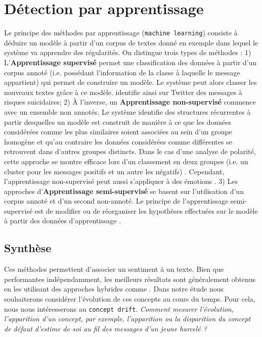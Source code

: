 \documentclass[utf8]{stageM2R} %
\theoremstyle{remark}
\renewcommand{\emph}{\textbf}
\begin{document}
\section{Détection par apprentissage}
Le principe des méthodes par apprentissage (\texttt{machine learning}) consiste à déduire un modèle à partir d'un corpus de textes donné en exemple dans lequel le système  va apprendre des régularités. On distingue  trois types de méthodes : 1) L'\emph{Apprentissage supervisé}
 permet une classification des données à partir d'un corpus annoté (i.e. possédant l'information de la classe à laquelle le message appartient) qui permet de construire un modèle. Le système peut alors classer les nouveaux textes grâce à ce modèle. \cite{Abboute2014} identifie ainsi sur Twitter des messages à risques suicidaires; 2)  À l'inverse, un \emph{Apprentissage non-supervisé}  commence  avec un ensemble non annotés. Le système  identifie des structures récurrentes à partir desquelles un modèle est construit de manière à ce que les données considérées comme les plus similaires soient associées au sein d'un groupe homogène et qu'au contraire les données considérées comme différentes se retrouvent dans d'autres groupes distincts. Dans le cas d'une analyse de polarité, cette approche se montre efficace lors d'un classement en deux groupes  (i.e. un cluster pour les messages positifs et un autre les négatifs) \cite{Li2014}. Cependant, l'apprentissage non-supervisé peut aussi s'appliquer à des émotions \cite{Kim2010}.  3) Les approches d'\emph{Apprentissage semi-supervisé} se basent sur l'utilisation d'un corpus annoté et d'un second non-annoté. Le principe de l'apprentissage semi-supervisé est de modifier ou de réorganiser les hypothèses effectuées sur le modèle à partir des données d'apprentissage \cite{Ortigosa-Hernandez2012}.

\subsection{Synthèse}
Ces méthodes permettent d'associer un sentiment à un texte. Bien que  performantes indépendamment, les meilleurs résultats sont généralement obtenus en les utilisant  des approches hybrides comme \cite{Prabowo2009}.  Dans notre étude nous souhaiterons considérer l'évolution de ces concepts au cours du temps. Pour cela, nous nous intéresserons au \texttt{concept drift}. \textit{Comment mesurer l'évolution, l'apparition d'un concept, par exemple, l'apparition ou la disparition du concept de défaut d'estime de soi au fil des messages d'un jeune harcelé ?}
\end{document}
